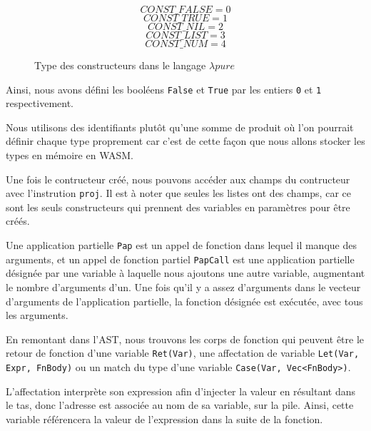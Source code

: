 \documentclass{rapportECL}
\begin{document}
\begin{figure}[H]
\begin{equation*}
CONST\_FALSE = 0
\end{equation*}
\begin{equation*}
CONST\_TRUE = 1
\end{equation*}
\begin{equation*}
CONST\_NIL = 2
\end{equation*}
\begin{equation*}
CONST\_LIST = 3
\end{equation*}
\begin{equation*}
CONST\_NUM = 4
\end{equation*}
\caption{Type des constructeurs dans le langage $\lambda{pure}$}
\label{listing:types_ctor}
\end{figure}
\FloatBarrier 
Ainsi, nous avons défini les booléens \verb|False| et \verb|True| par les entiers \verb|0| et \verb|1| respectivement.

Nous utilisons des identifiants plutôt qu'une somme de produit où l'on pourrait définir chaque type proprement car 
c'est de cette façon que nous allons stocker les types en mémoire en WASM.

Une fois le contructeur créé, nous pouvons accéder aux champs du contructeur avec l'instrution \verb|proj|.
Il est à noter que seules les listes ont des champs, car ce sont les seuls constructeurs qui prennent
des variables en paramètres pour être créés.

\medskip

Une application partielle \verb|Pap| est un appel de fonction dans lequel il manque des arguments, 
et un appel de fonction partiel \verb|PapCall| est une application partielle désignée par une variable
à laquelle nous ajoutons une autre variable, augmentant le nombre d'arguments d'un. 
Une fois qu'il y a assez d'arguments dans le vecteur d'arguments de l'application partielle,
la fonction désignée est exécutée, avec tous les arguments.

\bigskip

En remontant dans l'AST, nous trouvons les corps de fonction qui peuvent être le retour de fonction d'une variable \verb|Ret(Var)|, 
une affectation de variable \verb|Let(Var, Expr, FnBody)| ou un match du type d'une variable 
\verb|Case(Var, Vec<FnBody>)|.

\medskip

L'affectation interprète son expression afin d'injecter la valeur en résultant dans le tas, donc l'adresse est associée
au nom de sa variable, sur la pile. Ainsi, cette variable référencera la valeur de l'expression
dans la suite de la fonction.
\end{document}
